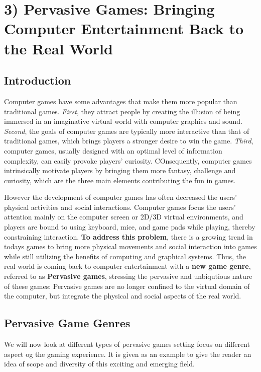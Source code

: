 \chapter*{3) Pervasive Games: Bringing Computer Entertainment Back to the Real World}

  \section*{Introduction}
  Computer games have some advantages that make them more popular than traditional games. {\it First}, they attract people by creating the illusion of being immersed in an imaginative virtual world with computer graphics and sound. {\it Second}, the goals of computer games are typically more interactive than that of traditional games, which brings players a stronger desire to win the game. {\it Third}, computer games, usually designed with an optimal level of information complexity, can easily provoke players' curiosity. COnsequently, computer games intrinsically motivate players by bringing them more fantasy, challenge and curiosity, which are the three main elements contributing the fun in games. 

  However the development of computer games has often decreased the users' physical activities and social interactions. Computer games focus the users' attention mainly on the computer screen or 2D/3D virtual environments, and players are bound to using keyboard, mice, and game pads while playing, thereby constraining interaction. {\bf To address this problem}, there is a growing trend in todays games to bring more physical movements and social interaction into games while still utilizing the benefits of computing and graphical systems. Thus, the real world is coming back to computer entertainment with a {\bf new game genre}, referred to as {\bf Pervasive games}, stressing the pervasive and unbiqutious nature of these games: Pervasive games are no longer confined to the virtual domain of the computer, but integrate the physical and social aspects of the real world. 

  \section*{Pervasive Game Genres}
    We will now look at different types of pervasive games setting focus on different aspect og the gaming experience.
    It is given as an example to give the reader an idea of scope and diversity of this exciting and emerging field. 

